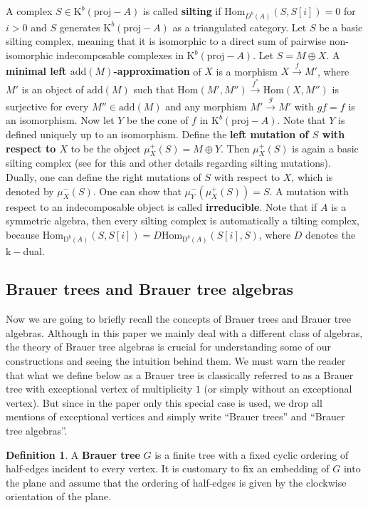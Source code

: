 \documentclass[12pt]{amsart}
\theoremstyle{plain}
\theoremstyle{remark}
\theoremstyle{definition}
\newtheorem{definition}{Definition}[section]
\newcommand{\proj}{{\mathrm{proj}}}
\newcommand{\Hom}{{\mathrm{Hom}}}
\newcommand{\add}{{\mathrm{add}}}
\newcommand{\D}{{\mathrm{D}}}
\newcommand{\K}{{\mathrm{K}}}
\def\kk{\mathrm{k}}
\begin{document}
A complex $S \in \K^b(\proj-A)$ is called {\bf silting} if $\Hom_{D^b(A)}(S, S[i]) = 0$ for $i>0$ and $S$ generates $\K^b(\proj-A)$ as a triangulated category.  Let $S$ be a basic silting complex, meaning that it is isomorphic to a direct sum of pairwise non-isomorphic indecomposable complexes in $\K^b(\proj-A)$. Let $S = M \oplus X$. A {\bf minimal left $\add(M)$-approximation} of $X$ is a morphism $X \xrightarrow{f} M'$, where $M'$ is an object of $\add(M)$ such that $\Hom(M',M'') \xrightarrow{f^*} \Hom(X,M'')$ is surjective for every $M'' \in \add(M)$ and any morphism $M' \xrightarrow{g} M'$ with $gf = f$ is an isomorphism. Now let $Y$ be the cone of $f$ in $\K^b(\proj-A)$. Note that $Y$ is defined uniquely up to an isomorphism. Define the {\bf left mutation of $S$ with respect to $X$} to be the object $\mu_X^+(S) = M \oplus Y$. Then $\mu_X^+(S)$ is again a basic silting complex (see \cite{AI} for this and other details regarding silting mutations). Dually, one can define the right mutations of $S$ with respect to $X$, which is denoted by $\mu_X^-(S)$. One can show that $\mu_Y^-(\mu_X^+(S)) = S$. A mutation with respect to an indecomposable object is called {\bf irreducible}. Note that if $A$ is a symmetric algebra, then every silting complex is automatically a tilting complex, because $\Hom_{\D^b(A)}(S,S[i]) = D\Hom_{\D^b(A)}(S[i],S)$, where $D$ denotes the $\kk-$dual.

\subsection{Brauer trees and Brauer tree algebras}

Now we are going to briefly recall the concepts of Brauer trees and Brauer tree algebras. Although in this paper we mainly deal with a different class of algebras, the theory of Brauer tree algebras is crucial for understanding some of our constructions and seeing the intuition behind them. We must warn the reader that what we define below as a Brauer tree is classically referred to as a Brauer tree with exceptional vertex of multiplicity $1$ (or simply without an exceptional vertex). But since in the paper only this special case is used, we drop all mentions of exceptional vertices and simply write ``Brauer trees'' and ``Brauer tree algebras''. 

\begin{definition}
 A {\bf Brauer tree} $G$ is a finite tree with a fixed cyclic ordering of half-edges incident to every vertex. It is customary to fix an embedding of $G$ into the plane and assume that the ordering of half-edges is given by the clockwise orientation of the plane. 
\end{definition}
\end{document}
